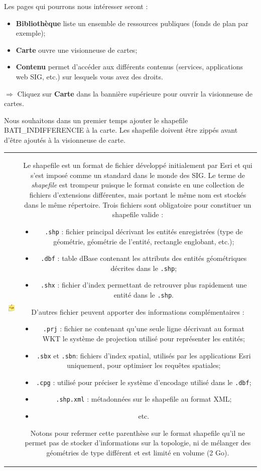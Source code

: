 \documentclass[11pt]{article}
\newcommand{\action}{$\Rightarrow$ }
\newenvironment{note}{%
	\begin{tabular}[t t]{c c}
		\includegraphics{img/tips.png}
		 &
		\begin{minipage}[c]{0.9\linewidth}
			\begin{sffamily}
}{%
			\end{sffamily}
		\end{minipage}
	\end{tabular}	
}
\newcommand{\code}[1]{\lstinline{#1}}
\begin{document}
Les pages qui pourrons nous intéresser seront :
\begin{itemize}
	\item \textbf{Bibliothèque} liste un ensemble de ressources publiques (fonds de plan par exemple);
	\item \textbf{Carte} ouvre une visionneuse de cartes;
	\item \textbf{Contenu} permet d'accéder aux différents contenus (services, applications web SIG, etc.) sur lesquels vous avez des droits.
\end{itemize}

\vspace{1em}

\action Cliquez sur \textbf{Carte} dans la bannière supérieure pour ouvrir la visionneuse de cartes.

Nous souhaitons dans un premier temps ajouter le shapefile BATI\_INDIFFERENCIE à la carte. Les shapefile doivent être zippés avant d'être ajoutés à la visionneuse de carte.

\begin{note}
Le shapefile est un format de fichier développé initialement par Esri et qui s'est imposé comme un standard dans le monde des SIG. Le terme de \textit{shapefile} est trompeur puisque le format consiste en une collection de fichiers d'extensions différentes, mais portant le même nom est stockés dans le même répertoire. Trois fichiers sont obligatoire pour constituer un shapefile valide :
\begin{itemize}
	\item \code{.shp} : fichier principal décrivant les entités enregistrées (type de géométrie, géométrie de l'entité, rectangle englobant, etc.);
	\item \code{.dbf} : table dBase contenant les attributs des entités géométriques décrites dans le \code{.shp};
	\item \code{.shx} : fichier d'index permettant de retrouver plus rapidement une entité dans le \code{.shp}.
\end{itemize}
D'autres fichier peuvent apporter des informations complémentaires :
\begin{itemize}
	\item \code{.prj} : fichier ne contenant qu'une seule ligne décrivant au format WKT le système de projection utilisé pour représenter les entités;
	\item \code{.sbx} et \code{.sbn}: fichiers d'index spatial, utilisés par les applications Esri uniquement, pour optimiser les requêtes spatiales;
	\item \code{.cpg} : utilisé pour préciser le système d'encodage utilisé dans le \code{.dbf};
	\item \code{.shp.xml} : métadonnées sur le shapefile au format XML;
	\item etc.
\end{itemize}
Notons pour refermer cette parenthèse sur le format shapefile qu'il ne permet pas de stocker d'informations sur la topologie, ni de mélanger des géométries de type différent et est limité en volume (2 Go).
\end{note}
\end{document}
